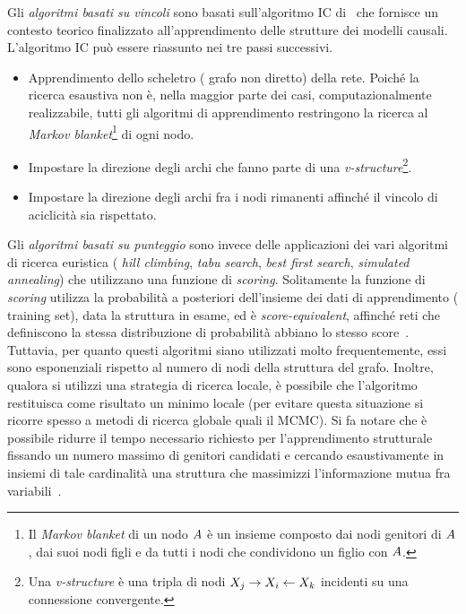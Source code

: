 Gli \emph{algoritmi basati su vincoli} sono basati sull'algoritmo \acf{IC} di~\citet{Verma1991} che fornisce un contesto teorico finalizzato all'apprendimento delle strutture dei modelli causali. L'algoritmo \acs{IC} può essere riassunto nei tre passi successivi.
\begin{itemize}
    \item Apprendimento dello scheletro (\ie{} grafo non diretto) della rete. Poiché la ricerca esaustiva non è, nella maggior parte dei casi, computazionalmente realizzabile, tutti gli algoritmi di apprendimento restringono la ricerca al \emph{Markov blanket}\footnote{\label{note:markov-blanket}Il \emph{Markov blanket} di un nodo $\mathnormal{A}$ è un insieme composto dai nodi genitori di $\mathnormal{A}$, dai suoi nodi figli e da tutti i nodi che condividono un figlio con $\mathnormal{A}$.} di ogni nodo.
    \item Impostare la direzione degli archi che fanno parte di una \emph{v-structure}\footnote{Una \emph{v-structure} è una tripla di nodi $\mathnormal{X}_j\rightarrow\mathnormal{X}_i\leftarrow\mathnormal{X}_k$ incidenti su una connessione convergente.}.
    \item Impostare la direzione degli archi fra i nodi rimanenti affinché il vincolo di aciclicità sia rispettato.
\end{itemize}

Gli \emph{algoritmi basati su punteggio} sono invece delle applicazioni dei vari algoritmi di ricerca euristica (\eg{} \emph{hill climbing}, \emph{tabu search}, \emph{best first search}, \emph{simulated annealing}) che utilizzano una funzione di \emph{scoring}. Solitamente la funzione di \emph{scoring} utilizza la probabilità a posteriori dell'insieme dei dati di apprendimento (\ie{} training set), data la struttura in esame, ed è \emph{score-equivalent}, affinché reti che definiscono la stessa distribuzione di probabilità abbiano lo stesso score~\citep{Chickering2013}. Tuttavia, per quanto questi algoritmi siano utilizzati molto frequentemente, essi sono esponenziali rispetto al numero di nodi della struttura del grafo. Inoltre, qualora si utilizzi una strategia di ricerca locale, è possibile che l'algoritmo restituisca come risultato un minimo locale (per evitare questa situazione si ricorre spesso a metodi di ricerca globale quali il \acs{MCMC}). Si fa notare che è possibile ridurre il tempo necessario richiesto per l'apprendimento strutturale fissando un numero massimo di genitori candidati e cercando esaustivamente in insiemi di tale cardinalità una struttura che massimizzi l'informazione mutua fra variabili~\citep[][]{Heckerman1995}.

